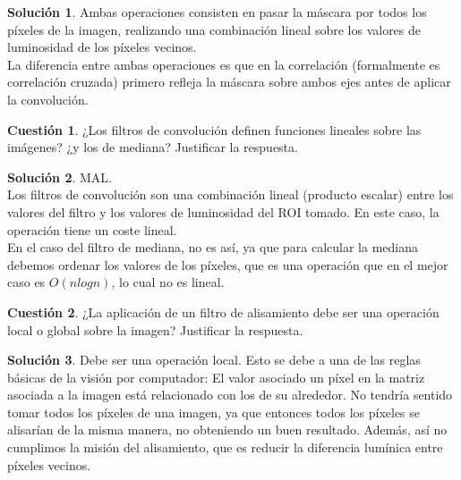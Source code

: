 \documentclass[a4paper, 11pt]{article}
\theoremstyle{definition}
\newtheorem{cuestion}{Cuestión}
\newtheorem*{solucion}{Solución}
\begin{document}
  \begin{solucion}
      Ambas operaciones consisten en pasar la máscara por todos los píxeles de la imagen,
      realizando una combinación lineal sobre los valores de luminosidad de los píxeles vecinos. \\

      La diferencia entre ambas operaciones es que en la correlación (formalmente
      es correlación cruzada) primero refleja la máscara sobre ambos ejes antes de
      aplicar la convolución.
  \end{solucion}

  \begin{cuestion}
      ¿Los filtros de convolución definen funciones lineales sobre las
      imágenes? ¿y los de mediana? Justificar la respuesta.
  \end{cuestion}

  \begin{solucion}
    MAL.\\
      Los filtros de convolución son una combinación lineal (producto escalar) entre
      los valores del filtro y los valores de luminosidad del ROI tomado. En este caso,
      la operación tiene un coste lineal.\\

      En el caso del filtro de mediana, no es así, ya que para calcular la mediana
      debemos ordenar los valores de los píxeles, que es una operación que en el mejor
      caso es $O(n logn)$, lo cual no es lineal.
  \end{solucion}

  \begin{cuestion}
      ¿La aplicación de un filtro de alisamiento debe ser una operación
      local o global sobre la imagen? Justificar la respuesta.
  \end{cuestion}

  \begin{solucion}
      Debe ser una operación local. Esto se debe a una de las reglas básicas de la
      visión por computador: El valor asociado un píxel en la matriz asociada a la imagen
      está relacionado con los de su alrededor.
      No tendría sentido tomar todos los píxeles de una imagen,
      ya que entonces todos los píxeles se alisarían de la misma manera, no obteniendo
      un buen resultado. Además, así no cumplimos la misión del alisamiento, que
      es reducir la diferencia lumínica entre píxeles vecinos.
  \end{solucion}
\end{document}
